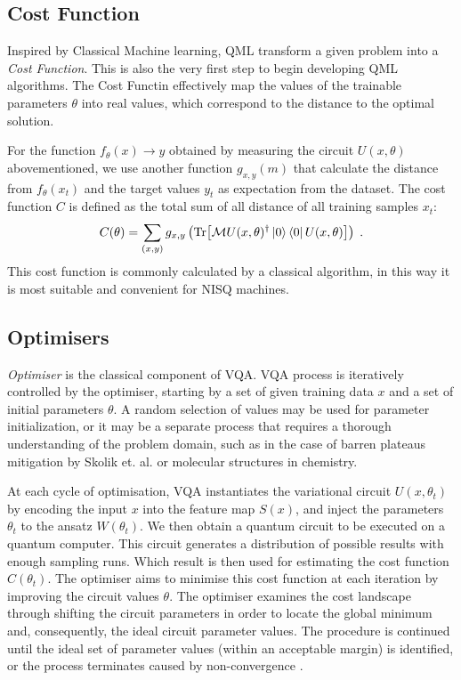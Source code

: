 \subsection{Cost Function} \label{Sec: Cost Function}

Inspired by Classical Machine learning, QML transform a given problem into a \emph{Cost Function}.
This is also the very first step to begin developing QML algorithms.
The Cost Functin effectively map the values of the trainable parameters $\theta$ into real values, which correspond to the distance to the optimal solution.

For the function ${f_\theta(x) \rightarrow y}$ obtained by measuring the circuit $U(x, \theta)$ abovementioned, we use another function $g_{x,y}(m)$ that calculate the distance from $f_\theta(x_t)$ and the target values $y_t$ as expectation from the dataset.
The cost function $C$ is defined as the total sum of all distance of all training samples $x_t$:
\begin{equation}
    C(\theta) = \sum_{(x,y)} g_{x,y} \left(\Tr[ \mathcal{M} U(x, \theta)^\dagger \left\vert{0}\right\rangle \left\langle{0}\right\vert U(x, \theta) ]\right) \;.
    \label{Eqn: Cost function}
\end{equation}
This cost function is commonly calculated by a classical algorithm, in this way it is most suitable and convenient for NISQ machines.

\subsection{Optimisers} \label{Sec: Optimiser}

\emph{Optimiser} is the classical component of VQA.
VQA process is iteratively controlled by the optimiser, starting by a set of given training data $x$ and a set of initial parameters $\theta$.
A random selection of values may be used for parameter initialization, or it may be a separate process that requires a thorough understanding of the problem domain,
such as in the case of barren plateaus mitigation by Skolik et. al. \cite{skolikLayerwiseLearningQuantum2021a} or molecular structures in chemistry.

At each cycle of optimisation, VQA instantiates the variational circuit $U(x, \theta_t)$ by encoding the input $x$ into the feature map $S(x)$, and inject the parameters $\theta_t$ to the ansatz $W(\theta_t)$.
We then obtain a quantum circuit to be executed on a quantum computer.
This circuit generates a distribution of possible results with enough sampling runs.
Which result is then used for estimating the cost function $C(\theta_t)$.
The optimiser aims to minimise this cost function at each iteration by improving the circuit values $\theta$.
The optimiser examines the cost landscape through shifting the circuit parameters in order to locate the global minimum and, consequently, the ideal circuit parameter values.
The procedure is continued until the ideal set of parameter values (within an acceptable margin) is identified, or the process terminates caused by non-convergence \cite{cerezoVariationalQuantumAlgorithms2021}.

